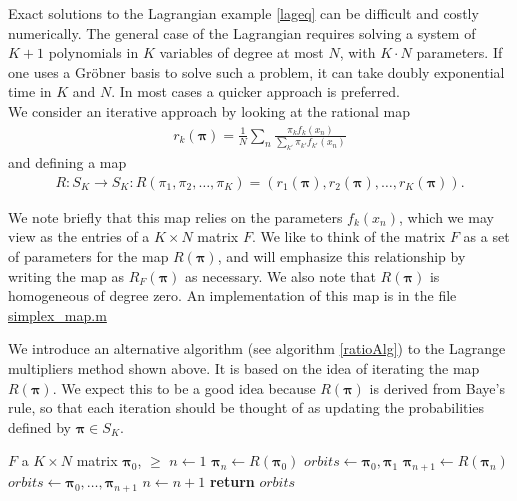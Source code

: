 Exact solutions to the Lagrangian example \ref{lageq} can be difficult and costly numerically.  The general case of the Lagrangian requires solving a system of $K+1$ polynomials in $K$ variables of degree at most $N$, with $K\cdot N$ parameters.  If one uses a Gr\"obner basis to solve such a problem, it can take doubly exponential time in $K$ and $N$.  In most cases a quicker approach is preferred. \\

We consider an iterative approach by looking at the rational map
\begin{align*}
r_k(\bm\pi)=\frac 1N\sum_n \frac{\pi_k f_k(x_n)}{\sum_{k'}\pi_{k'}f_{k'}(x_n)}
\end{align*}
and defining a map 
\begin{align}\label{map}
R:S_K\rightarrow S_K: R(\pi_1,\pi_2,\ldots,\pi_K)=(r_1(\bm\pi),r_2(\bm\pi),\ldots,r_K(\bm\pi)).
\end{align}

We note briefly that this map relies on the parameters $f_k(x_n)$, which we may view as the entries of a $K\times N$ matrix $F$. We like to think of the matrix $F$ as a set of parameters for the map $R(\bm\pi)$, and will emphasize this relationship by writing the map as $R_F(\bm\pi)$ as necessary. We also note that $R(\bm\pi)$ is homogeneous of degree zero.  An implementation of this map is in the file \url{simplex_map.m}

We introduce an alternative algorithm (see algorithm \ref{ratioAlg}) to the Lagrange multipliers method shown above.  It is based on the idea of iterating the map $R(\bm\pi)$. We expect this to be a good idea because $R(\bm\pi)$ is derived from Baye's rule, so that each iteration should be thought of as updating the probabilities defined by $\bm\pi\in S_K$.  

\begin{table}

\begin{algorithm}[H]
\caption{Iterative Algorithm}\label{ratioAlg}
\begin{algorithmic}
\Require $F$ a $K\times N$ matrix
\Require $\bm\pi_0$, $\ge$
\Comment{}
	\State $n \gets 1$
	\State $\bm\pi_n \gets R(\bm\pi_0)$
	\State $orbits \gets {\bm\pi_0,\bm\pi_1}$
		\State $\bm\pi_{n+1} \gets R(\bm\pi_n)$
		\State $orbits \gets {\bm\pi_0,\ldots,\bm\pi_{n+1}}$
		\State $n\gets n+1$
	\EndWhile
	\State \textbf{return} $orbits$ 
\EndProcedure
\end{algorithmic}
\end{algorithm}
\caption{The main algorithm: Iteration of the\Rpi F map.}
\end{table}

